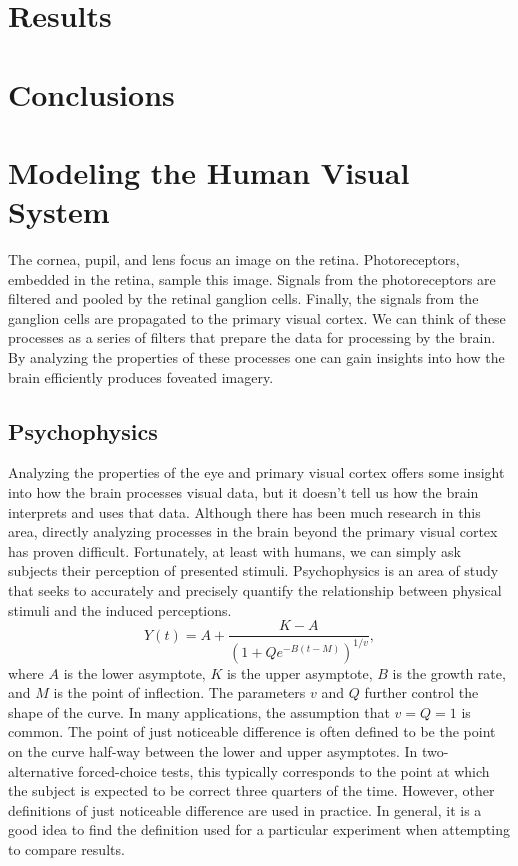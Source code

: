 \documentclass{article}
\begin{document}
\section{Results}

\section{Conclusions}

\section{Modeling the Human Visual System}
The cornea, pupil, and lens focus an image on the retina.
Photoreceptors, embedded in the retina, sample this image. 
Signals from the photoreceptors are filtered and pooled by the retinal ganglion cells.
Finally, the signals from the ganglion cells are propagated to the primary visual cortex.
We can think of these processes as a series of filters that prepare the data for processing by the brain.
By analyzing the properties of these processes one can gain insights into how the brain efficiently produces foveated imagery.

\subsection{Psychophysics}
Analyzing the properties of the eye and primary visual cortex offers some insight into how the brain processes visual data, but it doesn't tell us how the brain interprets and uses that data.
Although there has been much research in this area, directly analyzing processes in the brain beyond the primary visual cortex has proven difficult.
Fortunately, at least with humans, we can simply ask subjects their perception of presented stimuli.
Psychophysics is an area of study that seeks to accurately and precisely quantify the relationship between physical stimuli and the induced perceptions.
\begin{equation}
Y(t) = A + \frac{K - A}{ \left( 1 + Q e^{ -B ( t - M ) } \right)^{1/v} },
\end{equation}
where $A$ is the lower asymptote, $K$ is the upper asymptote, $B$ is the growth rate, and $M$ is the point of inflection.
The parameters $v$ and $Q$ further control the shape of the curve.
In many applications, the assumption that $v=Q=1$ is common. 
The point of just noticeable difference is often defined to be the point on the curve half-way between the lower and upper asymptotes.
In two-alternative forced-choice tests, this typically corresponds to the point at which the subject is expected to be correct three quarters of the time.
However, other definitions of just noticeable difference are used in practice.
In general, it is a good idea to find the definition used for a particular experiment when attempting to compare results.
\end{document}
